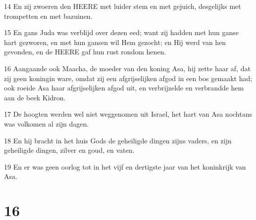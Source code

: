 \par 14 En zij zwoeren den HEERE met luider stem en met gejuich, desgelijks met trompetten en met bazuinen.
\par 15 En gans Juda was verblijd over dezen eed; want zij hadden met hun ganse hart gezworen, en met hun gansen wil Hem gezocht; en Hij werd van hen gevonden, en de HEERE gaf hun rust rondom henen.
\par 16 Aangaande ook Maacha, de moeder van den koning Asa, hij zette haar af, dat zij geen koningin ware, omdat zij een afgrijselijken afgod in een bos gemaakt had; ook roeide Asa haar afgrijselijken afgod uit, en verbrijzelde en verbrandde hem aan de beek Kidron.
\par 17 De hoogten werden wel niet weggenomen uit Israel, het hart van Asa nochtans was volkomen al zijn dagen.
\par 18 En hij bracht in het huis Gods de geheiligde dingen zijns vaders, en zijn geheiligde dingen, zilver en goud, en vaten.
\par 19 En er was geen oorlog tot in het vijf en dertigste jaar van het koninkrijk van Asa.

\chapter{16}

